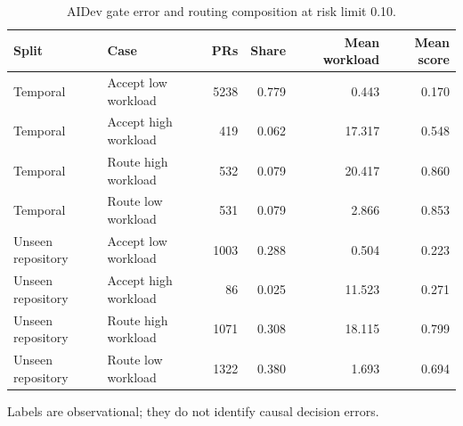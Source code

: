\begin{table}[t]
\centering
\scriptsize
\caption{AIDev gate error and routing composition at risk limit 0.10.}
\label{tab:aidev-errors}
\setlength{\tabcolsep}{3pt}
\begin{tabular}{llrrrr}
\toprule
Split & Case & PRs & Share & Mean workload & Mean score \\
\midrule
Temporal & Accept low workload & 5238 & 0.779 & 0.443 & 0.170 \\
Temporal & Accept high workload & 419 & 0.062 & 17.317 & 0.548 \\
Temporal & Route high workload & 532 & 0.079 & 20.417 & 0.860 \\
Temporal & Route low workload & 531 & 0.079 & 2.866 & 0.853 \\
Unseen repository & Accept low workload & 1003 & 0.288 & 0.504 & 0.223 \\
Unseen repository & Accept high workload & 86 & 0.025 & 11.523 & 0.271 \\
Unseen repository & Route high workload & 1071 & 0.308 & 18.115 & 0.799 \\
Unseen repository & Route low workload & 1322 & 0.380 & 1.693 & 0.694 \\
\bottomrule
\end{tabular}
\par\footnotesize{Labels are observational; they do not identify causal decision errors.}
\end{table}
